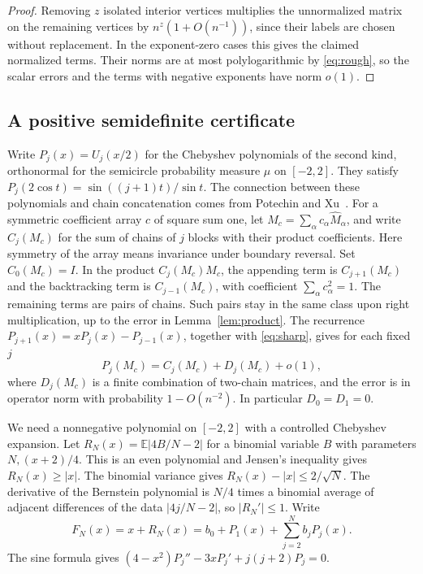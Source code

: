 \documentclass[11pt,letterpaper]{article}
\newcommand{\E}{\mathbb E}
\newcommand{\abs}[1]{\lvert #1\rvert}
\begin{document}
\begin{proof}
Removing \(z\) isolated interior vertices multiplies the unnormalized
matrix on the remaining vertices by \(n^z(1+O(n^{-1}))\), since their
labels are chosen without replacement. In the exponent-zero cases
this gives the claimed normalized terms. Their norms are at most
polylogarithmic by \eqref{eq:rough}, so the scalar errors and the terms
with negative exponents have norm \(o(1)\).
\end{proof}

\subsection{A positive semidefinite certificate}

Write \(P_j(x)=U_j(x/2)\) for the Chebyshev polynomials of the second
kind, orthonormal for the semicircle probability measure \(\mu\) on
\([-2,2]\). They satisfy \(P_j(2\cos t)=\sin((j+1)t)/\sin t\).
The connection between these polynomials and chain concatenation
comes from Potechin and Xu~\cite{PX}.
For a symmetric coefficient array \(c\) of square sum one,
let \(M_c=\sum_\alpha c_\alpha\widehat M_\alpha\), and write \(C_j(M_c)\)
for the sum of chains of \(j\) blocks with their product coefficients.
Here symmetry of the array means invariance under boundary reversal.
Set \(C_0(M_c)=I\). In the product \(C_j(M_c)M_c\), the appending term is
\(C_{j+1}(M_c)\) and the backtracking term is \(C_{j-1}(M_c)\), with
coefficient \(\sum_\alpha c_\alpha^2=1\). The remaining terms are
pairs of chains. Such pairs stay in the same class upon right
multiplication, up to the error in Lemma~\ref{lem:product}. The
recurrence \(P_{j+1}(x)=xP_j(x)-P_{j-1}(x)\), together with
\eqref{eq:sharp}, gives for each fixed \(j\)
\begin{equation}\label{eq:cheb}
 P_j(M_c)=C_j(M_c)+D_j(M_c)+o(1),
\end{equation}
where \(D_j(M_c)\) is a finite combination of two-chain matrices, and
the error is in operator norm with probability \(1-O(n^{-2})\).
In particular \(D_0=D_1=0\).

We need a nonnegative polynomial on \([-2,2]\) with a controlled
Chebyshev expansion. Let \(R_N(x)=\E\abs{4B/N-2}\) for a binomial
variable \(B\) with parameters \(N,(x+2)/4\). This is an even
polynomial and Jensen's inequality gives \(R_N(x)\ge\abs x\).
The binomial variance gives \(R_N(x)-\abs x\le2/\sqrt N\). The
derivative of the Bernstein polynomial is \(N/4\) times a binomial
average of adjacent differences of the data \(\abs{4j/N-2}\),
so \(\abs{R_N'}\le1\). Write
\[
 F_N(x)=x+R_N(x)=b_0+P_1(x)+\sum_{j=2}^N b_jP_j(x).
\]
The sine formula gives \((4-x^2)P_j''-3xP_j'+j(j+2)P_j=0\).
\end{document}
